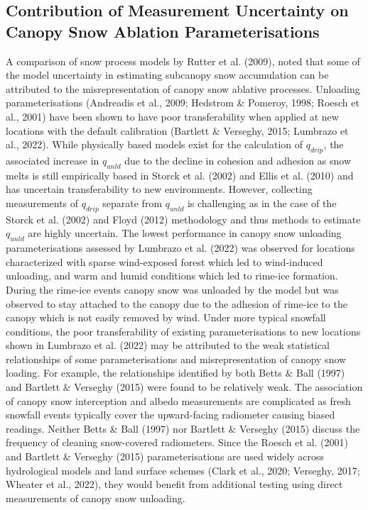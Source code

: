 \documentclass[
  letterpaper,
]{tex/uofsthesis-cs}
\begin{document}
\subsection{Contribution of Measurement Uncertainty on Canopy Snow
Ablation
Parameterisations}\label{contribution-of-measurement-uncertainty-on-canopy-snow-ablation-parameterisations}

A comparison of snow process models by Rutter et al. (2009), noted that
some of the model uncertainty in estimating subcanopy snow accumulation
can be attributed to the misrepresentation of canopy snow ablative
processes. Unloading parameterisations (Andreadis et al., 2009; Hedstrom
\& Pomeroy, 1998; Roesch et al., 2001) have been shown to have poor
transferability when applied at new locations with the default
calibration (Bartlett \& Verseghy, 2015; Lumbrazo et al., 2022). While
physically based models exist for the calculation of \(q_{drip}\), the
associated increase in \(q_{unld}\) due to the decline in cohesion and
adhesion as snow melts is still empirically based in Storck et al.
(2002) and Ellis et al. (2010) and has uncertain transferability to new
environments. However, collecting measurements of \(q_{drip}\) separate
from \(q_{unld}\) is challenging as in the case of the Storck et al.
(2002) and Floyd (2012) methodology and thus methods to estimate
\(q_{unld}\) are highly uncertain. The lowest performance in canopy snow
unloading parameterisations assessed by Lumbrazo et al. (2022) was
observed for locations characterized with sparse wind-exposed forest
which led to wind-induced unloading, and warm and humid conditions which
led to rime-ice formation. During the rime-ice events canopy snow was
unloaded by the model but was observed to stay attached to the canopy
due to the adhesion of rime-ice to the canopy which is not easily
removed by wind. Under more typical snowfall conditions, the poor
transferability of existing parameterisations to new locations shown in
Lumbrazo et al. (2022) may be attributed to the weak statistical
relationships of some parameterisations and misrepresentation of canopy
snow loading. For example, the relationships identified by both Betts \&
Ball (1997) and Bartlett \& Verseghy (2015) were found to be relatively
weak. The association of canopy snow interception and albedo
measurements are complicated as fresh snowfall events typically cover
the upward-facing radiometer causing biased readings. Neither Betts \&
Ball (1997) nor Bartlett \& Verseghy (2015) discuss the frequency of
cleaning snow-covered radiometers. Since the Roesch et al. (2001) and
Bartlett \& Verseghy (2015) parameterisations are used widely across
hydrological models and land surface schemes (Clark et al., 2020;
Verseghy, 2017; Wheater et al., 2022), they would benefit from
additional testing using direct measurements of canopy snow unloading.
\end{document}
